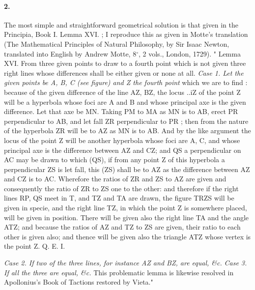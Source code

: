 \documentclass[11pt,a4paper]{book}
\begin{document}
\paragraph{2.} The  most  simple  and  straightforward  geometrical  solution  is  that  given  in
the  Principia,  Book  I.  Lemma  XVI. ;  I  reproduce  this  as  given  in  Motte's  translation
(The  Mathematical  Principles  of  Natural  Philosophy,  by  Sir  Isaac  Newton,  translated
into  English  by  Andrew  Motte,  8$^\circ$,  2  vols.,  London,  1729).
"  Lemma  XVI.  From  three  given  points  to  draw  to  a  fourth  point  which  is  not
given  three  right  lines  whose  differences  shall  be  either  given  or  none  at  all.
\noindent \textit{Case  1.  Let  the  given  points  be  A,  B,  C  (see  figure)  and  Z  the  fourth  point}
which  we  are  to  find :  because  of  the  given  difference  of  the  line  AZ,  BZ,  the  locus
..iZ
of  the  point  Z  will  be  a  hyperbola  whose  foci  are  A  and  B  and  whose  principal
axe  is  the  given  difference.  Let  that  axe  be  MN.  Taking  PM  to  MA  as  MN  is
to  AB,  erect  PR  perpendicular  to  AB,  and  let  fall  ZR  perpendicular  to  PR ;  then
from  the  nature  of  the  hyperbola  ZR  will  be  to  AZ  as  MN  is  to  AB.  And  by
the  like  argument  the  locus  of  the  point  Z  will  be  another  hyperbola  whose  foci
are  A,  C,  and  whose  principal  axe  is  the  difference  between  AZ  and  CZ;  and  QS
a  perpendicular  on  AC  may  be  drawn  to  which  (QS),  if  from  any  point  Z  of  this
hyperbola  a  perpendicular  ZS  is  let  fall,  this  (ZS)  shall  be  to  AZ  as  the  difference
between  AZ  and  CZ  is  to  AC.  Wherefore  the  ratios  of  ZR  and  ZS  to  AZ  are
given  and  consequently  the  ratio  of  ZR  to  ZS  one  to  the  other:  and  therefore  if
the  right  lines  RP,  QS  meet  in  T,  and  TZ  and  TA  are  drawn,  the  figure  TRZS
will  be  given  in  specie,  and  the  right  line  TZ,  in  which  the  point  Z  is  somewhere
placed,  will  be  given  in  position.  There  will  be  given  also  the  right  line  TA  and
the  angle  ATZ;  and  because  the  ratios  of  AZ  and  TZ  to  ZS  are  given,  their  ratio
to  each  other  is  given  also;  and  thence  will  be  given  also  the  triangle  ATZ  whose
vertex  is  the  point  Z.  Q.  E.  I.


\noindent \textit{Case  2.     If  two  of  the  three  lines,  for  instance  AZ  and  BZ,  are  equal,  \&c.}
\noindent \textit{Case  3.     If  all  the  three  are  equal,  \&c.}
This  problematic  lemma  is  likewise  resolved  in  Apollonius's  Book  of  Tactions
restored  by  Vieta."
\end{document}
